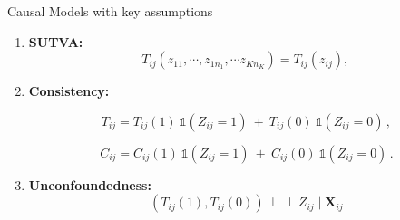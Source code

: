 \documentclass{beamer}
\begin{document}
\begin{frame}{Causal Models with key assumptions}
    \begin{enumerate}
\item \textbf{SUTVA:} 
\begin{equation}
   T_{ij}(z_{11},\cdots,z_{1n_1},\cdots z_{Kn_K}) = T_{ij}(z_{ij}),
   \hspace{2pt}
   \label{eq:SUTVA}
   \end{equation}


\item \textbf{Consistency:} 

\begin{equation}
   T_{ij} = T_{ij}(1)\ \mathds{1}(Z_{ij}=1)\ +\ T_{ij}(0)\ \mathds{1}(Z_{ij}=0)
   \hspace{2pt},
   \label{eq:Consistency_Outcome}
   \end{equation}

   \begin{equation}
   C_{ij} = C_{ij}(1)\ \mathds{1}(Z_{ij}=1)\ +\ C_{ij}(0)\ \mathds{1}(Z_{ij}=0)
   \hspace{2pt}.
   \label{eq:Consistency_Censor}
   \end{equation}

\item \textbf{Unconfoundedness:}
\begin{equation}
  \left( T_{ij}(1), T_{ij}(0) \right) \perp\!\!\!\perp Z_{ij} \mid   \mathbf{X}_{ij}
   \end{equation}




   
\end{enumerate}


\end{frame}
\end{document}
